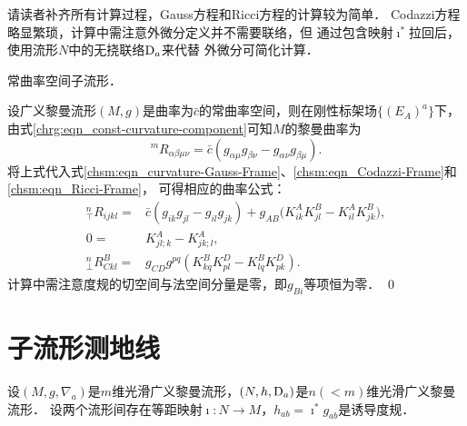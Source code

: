 请读者补齐所有计算过程，Gauss方程和Ricci方程的计算较为简单．
Codazzi方程略显繁琐，计算中需注意外微分定义并不需要联络，但
通过包含映射$\imath^*$拉回后，使用流形$N$中的无挠联络${\rm D}_a$来代替
外微分可简化计算．

\begin{example}
	常曲率空间子流形．
\end{example}

设广义黎曼流形$(M,g)$是曲率为$\bar{c}$的常曲率空间，则在刚性标架场$\{(E_A)^a\}$下，
由式\eqref{chrg:eqn_const-curvature-component}可知$M$的黎曼曲率为
\begin{equation}
    {}^m R_{\alpha\beta\mu\nu}= \bar{c} ( g_{\alpha\mu}g_{\beta\nu}- g_{\alpha\nu}g_{\beta\mu}  ).
\end{equation}
将上式代入式\eqref{chsm:eqn_curvature-Gauss-Frame}、\eqref{chsm:eqn_Codazzi-Frame}和\eqref{chsm:eqn_Ricci-Frame}，
可得相应的曲率公式：
\begin{align}
    {}^{n}_{\top}{R}_{ijkl} =& \bar{c} ( g_{ik}g_{jl}- g_{il}g_{jk}  )
    +{g}_{AB} \bigl(K^A_{ik}K^B_{jl} - K^A_{il} K^B_{jk} \bigr),  \\
    0 =& K^A_{jl;k}- K^A_{jk;l} ,\\
    {}^{n}_{\bot}{R}^B_{C kl} =&
    g_{CD} g^{pq} (K^B_{kq}K^D_{pl} - K^B_{lq} K^D_{pk}) .
\end{align}
计算中需注意度规的切空间与法空间分量是零，即$g_{B i}$等项恒为零． \qed



\section{子流形测地线}\label{chsm:sec_sub-Geodesic}
设$(M,g,\nabla_a)$是$m$维光滑广义黎曼流形，$(N,h,{\rm D}_a)$是$n(<m)$维光滑广义黎曼流形．
设两个流形间存在等距映射$\imath:N \to M$，$h_{ab}=\imath^* {g}_{ab}$是诱导度规．


